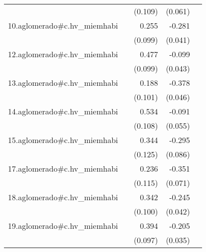 {\begin{longtable}{l*{4}{D{.}{.}{-1}}}
            &                     &     (0.109)         &     (0.061)         &                     \\
\addlinespace
10.aglomerado#c.hv\_miemhabi&                     &       0.255\sym{*}  &      -0.281\sym{***}&                     \\
            &                     &     (0.099)         &     (0.041)         &                     \\
\addlinespace
12.aglomerado#c.hv\_miemhabi&                     &       0.477\sym{***}&      -0.099\sym{*}  &                     \\
            &                     &     (0.099)         &     (0.043)         &                     \\
\addlinespace
13.aglomerado#c.hv\_miemhabi&                     &       0.188         &      -0.378\sym{***}&                     \\
            &                     &     (0.101)         &     (0.046)         &                     \\
\addlinespace
14.aglomerado#c.hv\_miemhabi&                     &       0.534\sym{***}&      -0.091         &                     \\
            &                     &     (0.108)         &     (0.055)         &                     \\
\addlinespace
15.aglomerado#c.hv\_miemhabi&                     &       0.344\sym{**} &      -0.295\sym{***}&                     \\
            &                     &     (0.125)         &     (0.086)         &                     \\
\addlinespace
17.aglomerado#c.hv\_miemhabi&                     &       0.236\sym{*}  &      -0.351\sym{***}&                     \\
            &                     &     (0.115)         &     (0.071)         &                     \\
\addlinespace
18.aglomerado#c.hv\_miemhabi&                     &       0.342\sym{***}&      -0.245\sym{***}&                     \\
            &                     &     (0.100)         &     (0.042)         &                     \\
\addlinespace
19.aglomerado#c.hv\_miemhabi&                     &       0.394\sym{***}&      -0.205\sym{***}&                     \\
            &                     &     (0.097)         &     (0.035)         &                     \\

\end{longtable}}
